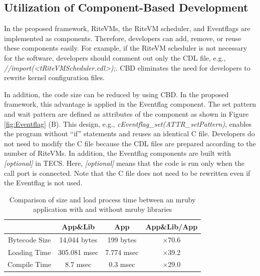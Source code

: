 \documentclass[S,R,E]{article/compsoft}
\begin{document}
 
\subsection{Utilization of Component-Based Development}
In the proposed framework, RiteVMs, the RiteVM scheduler, and Eventflags are implemented as components.
Therefore, developers can add, remove, or reuse these components easily.
For example, if the RiteVM scheduler is not necessary for the software, developers should comment out only the CDL file, e.g., {\it //import(<tRiteVMScheduler.cdl>);}.
CBD eliminates the need for developers to rewrite kernel configuration files.

In addition, the code size can be reduced by using CBD. 
In the proposed framework, this advantage is applied in the Eventflag component.
The set pattern and wait pattern are defined as attributes of the component as shown in Figure \ref{fig:Eventflag} (B).
This design, e.g., {\it cEventflag\_set(ATTR\_setPattern)}, enables the program without ``if'' statements and reuses an identical C file.
Developers do not need to modify the C file because the CDL files are prepared according to the number of RiteVMs.
In addition, the Eventflag components are built with {\it [optional]} in TECS.
Here, {\it [optional]} means that the code is run only when the call port is connected.
Note that the C file does not need to be rewritten even if the Eventflag is not used. 


\begin{table}[t]
    \centering
\caption{Comparison of size and load process time between an mruby application with and without mruby libraries}
    {\tabcolsep=0.1cm
    \begin{tabular}{c||c|c|c}
                            & App\&Lib     & App        &   App\&Lib/App  \\ \hline
          Bytecode Size     & 14,044 bytes & 199 bytes  &   $\times$70.6          \\ %
          Loading Time      & 305.081 msec & 7.774 msec &   $\times$39.2          \\
          Compile Time  & 8.7 msec     & 0.3 msec   &   $\times$29.0          \\
    \end{tabular}
    }
    \label{tab:size_and_time}
\end{table}
\end{document}
